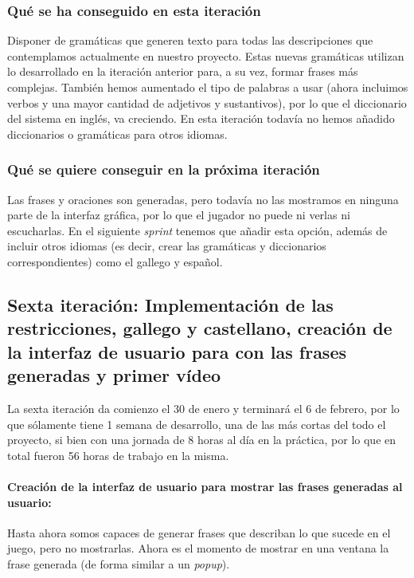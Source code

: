 \subsubsection{Qué se ha conseguido en esta iteración}

Disponer de gramáticas que generen texto para todas las descripciones que contemplamos actualmente en nuestro proyecto. Estas nuevas gramáticas utilizan lo desarrollado en la iteración anterior para, a su vez, formar frases más complejas. También hemos aumentado el tipo de palabras a usar (ahora incluimos verbos y una mayor cantidad de adjetivos y sustantivos), por lo que el diccionario del sistema en inglés, va creciendo. En esta iteración todavía no hemos añadido diccionarios o gramáticas para otros idiomas.

\subsubsection{Qué se quiere conseguir en la próxima iteración}

Las frases y oraciones son generadas, pero todavía no las mostramos en ninguna parte de la interfaz gráfica, por lo que el jugador no puede ni verlas ni escucharlas. En el siguiente \textit{sprint} tenemos que añadir esta opción, además de incluir otros idiomas (es decir, crear las gramáticas y diccionarios correspondientes) como el gallego y español.

\subsection{Sexta iteración: Implementación de las restricciones, gallego y castellano, creación de la interfaz de usuario para con las frases generadas y primer vídeo}

La sexta iteración da comienzo el 30 de enero y terminará el 6 de febrero, por lo que sólamente tiene 1 semana de desarrollo, una de las más cortas del todo el proyecto, si bien con una jornada de 8 horas al día en la práctica, por lo que en total fueron 56 horas de trabajo en la misma.

\paragraph{Creación de la interfaz de usuario para mostrar las frases generadas al usuario:} Hasta ahora somos capaces de generar frases que describan lo que sucede en el juego, pero no mostrarlas. Ahora es el momento de mostrar en una ventana la frase generada (de forma similar a un \textit{popup}).

